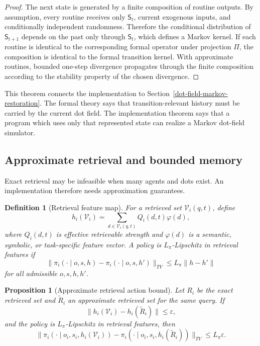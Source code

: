 \documentclass[11pt]{article}
\newtheorem{definition}{Definition}
\newtheorem{proposition}{Proposition}
\theoremstyle{remark}
\begin{document}
\begin{proof}
The next state is generated by a finite composition of routine outputs.
By assumption, every routine receives only $\mathsf S_t$, current
exogenous inputs, and conditionally independent randomness. Therefore the
conditional distribution of $\mathsf S_{t+1}$ depends on the past only
through $\mathsf S_t$, which defines a Markov kernel. If each routine is
identical to the corresponding formal operator under projection $\Pi$,
the composition is identical to the formal transition kernel. With
approximate routines, bounded one-step divergence propagates through the
finite composition according to the stability property of the chosen
divergence.
\end{proof}

This theorem connects the implementation to Section~\ref{dot-field-markov-restoration}.
The formal theory says that transition-relevant history must be carried
by the current dot field. The implementation theorem says that a program
which uses only that represented state can realize a Markov dot-field
simulator.

\subsection{Approximate retrieval and bounded memory}\label{approximate-retrieval-and-bounded-memory}

Exact retrieval may be infeasible when many agents and dots exist. An
implementation therefore needs approximation guarantees.

\begin{definition}[Retrieval feature map]\label{def:retrieval-feature-map}
For a retrieved set $\mathcal V_i(q,t)$, define
$$
h_i(\mathcal V_i)=\sum_{d\in \mathcal V_i(q,t)}Q_i(d,t)\varphi(d),
$$
where $Q_i(d,t)$ is effective retrievable strength and $\varphi(d)$ is a
semantic, symbolic, or task-specific feature vector. A policy is
$L_\pi$-Lipschitz in retrieval features if
$$
\|\pi_i(\cdot\mid o,s,h)-\pi_i(\cdot\mid o,s,h')\|_{TV}
\leq L_\pi\|h-h'\|
$$
for all admissible $o,s,h,h'$.
\end{definition}

\begin{proposition}[Approximate retrieval action bound]\label{prop:approximate-retrieval-action-bound}
Let $R_i$ be the exact retrieved set and $\widetilde R_i$ an approximate
retrieved set for the same query. If
$$
\|h_i(\mathcal V_i)-h_i(\widetilde R_i)\|\leq\varepsilon,
$$
and the policy is $L_\pi$-Lipschitz in retrieval features, then
$$
\|\pi_i(\cdot\mid o_i,s_i,h_i(\mathcal V_i))-\pi_i(\cdot\mid o_i,s_i,h_i(\widetilde R_i))\|_{TV}
\leq L_\pi\varepsilon.
$$
\end{proposition}
\end{document}
